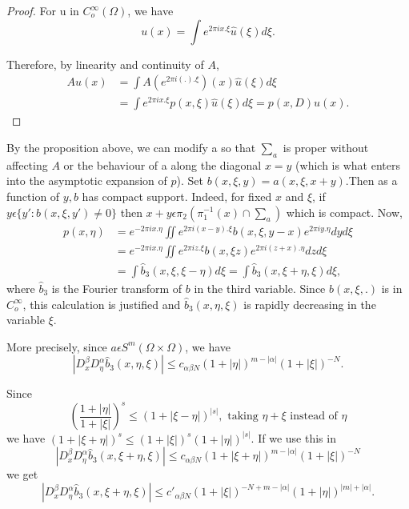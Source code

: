 \begin{proof}
  For u in $C^ \infty _o (\Omega)$, we have 
  $$
  u(x)= \int e^{2 \pi ix. \xi} \hat {u}(\xi)d \xi.
  $$
    
  Therefore, by linearity and continuity of $A$,
  \begin{align*}
    Au (x)&= \int A (e^{2 \pi i (.). \xi}) (x) \hat{u}(\xi)d \xi \\
    &= \int e^{2 \pi i x. \xi}p (x, \xi) \hat{u}(\xi)d \xi =p (x,D)u (x).
  \end{align*}
\end{proof}
 
 By the proposition above, we can modify a so that $\sum_a$ is proper
 without affecting $A$ or the behaviour of a along the diagonal $x=y$
 (which is what enters into the asymptotic expansion of $p$). Set $b(x, \xi
,y)=a (x, \xi, x+y)$.\pageoriginale Then as a function of $y,b$ has compact
 support. Indeed, for fixed $x$ and $\xi$, if $y \epsilon \{ y':
 b(x, \xi,y') \neq 0 \}$ then $x+y \epsilon \pi_2 (\pi ^{-1}_1 (x)
 \cap \sum_a)$ which is compact. Now, 
 \begin{align*}
   p (x, \eta) &= e^{-2 \pi i x. \eta} \iint e^{2 \pi i (x-y). \xi} b(x,
   \xi, y -x)e^{2 \pi i y. \eta} dy d \xi\\ 
   &= e^{-2 \pi i x. \eta} \iint e^{2 \pi i z. \xi}b (x, \xi z) e^ {2
     \pi i (z+x). \eta } dz d \xi \\ 
   &= \int \hat{b}_3 (x, \xi, \xi- \eta)d \xi = \int \hat{b}_3 (x, \xi
   + \eta,  \xi)d \xi, 
 \end{align*} 
 where $\hat{b}_3$ is the Fourier transform of $b$ in the third
 variable. Since $b(x, \xi,.)$ is in $C^ \infty _o$, this calculation
 is justified and $\hat{b}_3 (x, \eta, \xi)$ is rapidly decreasing in
 the variable $\xi$. 
  
 More precisely, since $a \epsilon S^m (\Omega \times \Omega)$, we have 
 \begin{equation}
   | D^\beta _x D^\alpha _\eta \hat{b}_3 (x, \eta, \xi) | \le c_{ \alpha
     \beta N} (1+| \eta |)^{m-| \alpha |}
   (1+|\xi|)^{-N}.\tag{4.29}\label{chap4:sec5:eq4.29}  
 \end{equation} 
 
 Since
$$
\left(\frac {1+|\eta|} {1+|\xi|} \right)^s \le (1+|\xi-
\eta|)^{|s|}, \text{ taking } \eta + \xi \text{ instead of } \eta 
$$
we have $(1 + |\xi+ \eta |)^s \le (1+ |\xi|)^s (1+ |\eta|)^{|s|}$. If
we use this in  
 $$
 |D^\beta _x D^\alpha _\eta \hat{b}_3 (x, \xi + \eta, \xi)| \le
 c_{\alpha \beta N}(1+|\xi+ \eta|)^{m-|\alpha|}(1+|\xi|)^{-N} 
 $$
 we get
 $$
 |D^\beta _x D^\alpha _\eta \hat{b}_3 (x, \xi + \eta, \xi)| \le
 c'_{\alpha \beta N}(1+|\xi|)^{-N+m-|\alpha|}(1+
 |\eta|)^{|m|+|\alpha|}. 
 $$
  
